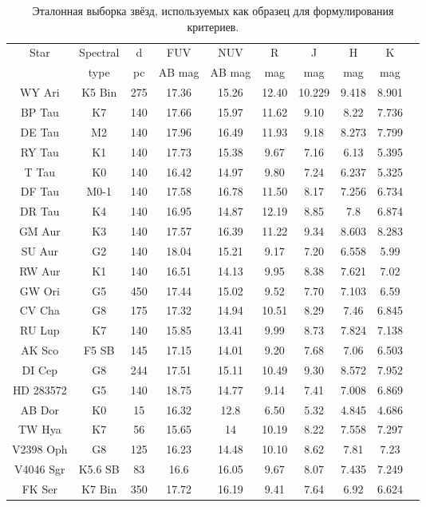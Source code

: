 \begin{table}[ht]
\caption{Эталонная выборка звёзд, используемых как образец для формулирования критериев.}
\label{tabular:etalon}
\begin{center}
\begin{tabular}{cccccccccc}
Star & Spectral & d & FUV & NUV & R & J & H & K \\
 &  type & pc & AB mag & AB  mag & mag & mag & mag & mag \\
WY Ari & K5 Bin & 275 & 17.36 & 15.26 & 12.40 & 10.229 & 9.418 & 8.901 \\
BP Tau & K7 & 140 & 17.66 & 15.97 & 11.62 & 9.10 & 8.22 & 7.736 \\
DE Tau & M2 & 140 & 17.96 & 16.49 & 11.93 & 9.18 & 8.273 & 7.799 \\
RY Tau & K1 & 140 & 17.73 & 15.38 & 9.67 & 7.16 & 6.13 & 5.395 \\
T Tau & K0 & 140 & 16.42 & 14.97 & 9.80 & 7.24 & 6.237 & 5.325 \\
DF Tau & M0-1 & 140 & 17.58 & 16.78 & 11.50 & 8.17 & 7.256 & 6.734 \\
DR Tau & K4 & 140 & 16.95 & 14.87 & 12.19 & 8.85 & 7.8 & 6.874 \\
GM Aur & K3 & 140 & 17.57 & 16.39 & 11.22 & 9.34 & 8.603 & 8.283 \\
SU Aur & G2 & 140 & 18.04 & 15.21 & 9.17 & 7.20 & 6.558 & 5.99 \\
RW Aur & K1 & 140 & 16.51 & 14.13 & 9.95 & 8.38 & 7.621 & 7.02 \\
GW Ori & G5 & 450 & 17.44 & 15.02 & 9.52 & 7.70 & 7.103 & 6.59 \\
CV Cha & G8 & 175 & 17.32 & 14.94 & 10.51 & 8.29 & 7.46 & 6.845 \\
RU Lup & K7 & 140 & 15.85 & 13.41 & 9.99 & 8.73 & 7.824 & 7.138 \\
AK Sco & F5 SB & 145 & 17.15 & 14.01 & 9.20 & 7.68 & 7.06 & 6.503 \\
DI Cep & G8 & 244 & 17.51 & 15.11 & 10.49 & 9.30 & 8.572 & 7.952 \\
HD 283572 & G5 & 140 & 18.75 & 14.77 & 9.14 & 7.41 & 7.008 & 6.869 \\
AB Dor & K0 & 15 & 16.32 & 12.8 & 6.50 & 5.32 & 4.845 & 4.686 \\
TW Hya & K7 & 56 & 15.65 & 14 & 10.19 & 8.22 & 7.558 & 7.297 \\
V2398 Oph & G8 & 125 & 16.23 & 14.48 & 10.10 & 8.62 & 7.81 & 7.23 \\
V4046 Sgr & K5.6 SB & 83 & 16.6 & 16.05 & 9.67 & 8.07 & 7.435 & 7.249 \\
FK Ser & K7 Bin & 350 & 17.72 & 16.19 & 9.41 & 7.64 & 6.92 & 6.624 \\
\end{tabular}
\end{center}
\end{table}

